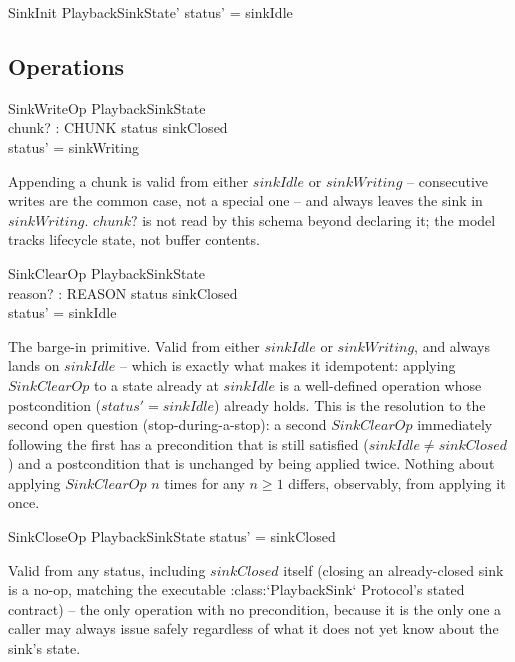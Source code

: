 \documentclass[a4paper,10pt,fleqn]{article}
\begin{document}
\begin{schema}{SinkInit}
  PlaybackSinkState'
  \where
  status' = sinkIdle
\end{schema}

\subsection{Operations}

\begin{schema}{SinkWriteOp}
  \Delta PlaybackSinkState \\
  chunk? : CHUNK
  \where
  status \neq sinkClosed \\
  status' = sinkWriting
\end{schema}

Appending a chunk is valid from either $sinkIdle$ or $sinkWriting$ --
consecutive writes are the common case, not a special one -- and always
leaves the sink in $sinkWriting$. $chunk?$ is not read by this schema
beyond declaring it; the model tracks lifecycle state, not buffer contents.

\begin{schema}{SinkClearOp}
  \Delta PlaybackSinkState \\
  reason? : REASON
  \where
  status \neq sinkClosed \\
  status' = sinkIdle
\end{schema}

The barge-in primitive. Valid from either $sinkIdle$ or $sinkWriting$, and
always lands on $sinkIdle$ -- which is exactly what makes it idempotent:
applying $SinkClearOp$ to a state already at $sinkIdle$ is a well-defined
operation whose postcondition ($status' = sinkIdle$) already holds. This is
the resolution to the second open question (stop-during-a-stop): a second
$SinkClearOp$ immediately following the first has a precondition that is
still satisfied ($sinkIdle \neq sinkClosed$) and a postcondition that is
unchanged by being applied twice. Nothing about applying $SinkClearOp$
$n$ times for any $n \geq 1$ differs, observably, from applying it once.

\begin{schema}{SinkCloseOp}
  \Delta PlaybackSinkState
  \where
  status' = sinkClosed
\end{schema}

Valid from any status, including $sinkClosed$ itself (closing an
already-closed sink is a no-op, matching the executable
:class:`PlaybackSink` Protocol's stated contract) -- the only operation with
no precondition, because it is the only one a caller may always issue
safely regardless of what it does not yet know about the sink's state.
\end{document}

